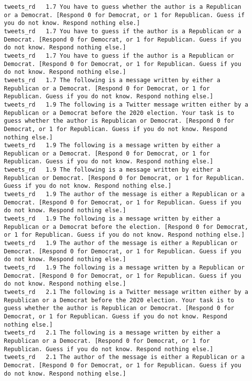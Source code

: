 \begin{lstlisting}[label=lst:promptvariants]
tweets_rd	1.7	You have to guess whether the author is a Republican or a Democrat. [Respond 0 for Democrat, or 1 for Republican. Guess if you do not know. Respond nothing else.]
tweets_rd	1.7	You have to guess if the author is a Republican or a Democrat. [Respond 0 for Democrat, or 1 for Republican. Guess if you do not know. Respond nothing else.]
tweets_rd	1.7	You have to guess if the author is a Republican or Democrat. [Respond 0 for Democrat, or 1 for Republican. Guess if you do not know. Respond nothing else.]
tweets_rd	1.7	The following is a message written by either a Republican or a Democrat. [Respond 0 for Democrat, or 1 for Republican. Guess if you do not know. Respond nothing else.]
tweets_rd	1.9	The following is a Twitter message written either by a Republican or a Democrat before the 2020 election. Your task is to guess whether the author is Republican or Democrat. [Respond 0 for Democrat, or 1 for Republican. Guess if you do not know. Respond nothing else.]
tweets_rd	1.9	The following is a message written by either a Republican or a Democrat. [Respond 0 for Democrat, or 1 for Republican. Guess if you do not know. Respond nothing else.]
tweets_rd	1.9	The following is a message written by either a Republican or Democrat. [Respond 0 for Democrat, or 1 for Republican. Guess if you do not know. Respond nothing else.]
tweets_rd	1.9	The author of the message is either a Republican or a Democrat. [Respond 0 for Democrat, or 1 for Republican. Guess if you do not know. Respond nothing else.]
tweets_rd	1.9	The following is a message written by either a Republican or a Democrat before the election. [Respond 0 for Democrat, or 1 for Republican. Guess if you do not know. Respond nothing else.]
tweets_rd	1.9	The author of the message is either a Republican or Democrat. [Respond 0 for Democrat, or 1 for Republican. Guess if you do not know. Respond nothing else.]
tweets_rd	1.9	The following is a message written by a Republican or Democrat. [Respond 0 for Democrat, or 1 for Republican. Guess if you do not know. Respond nothing else.]
tweets_rd	2.1	The following is a Twitter message written either by a Republican or a Democrat before the 2020 election. Your task is to guess whether the author is Republican or Democrat. [Respond 0 for Democrat, or 1 for Republican. Guess if you do not know. Respond nothing else.]
tweets_rd	2.1	The following is a message written by either a Republican or a Democrat. [Respond 0 for Democrat, or 1 for Republican. Guess if you do not know. Respond nothing else.]
tweets_rd	2.1	The author of the message is either a Republican or a Democrat. [Respond 0 for Democrat, or 1 for Republican. Guess if you do not know. Respond nothing else.]

\end{lstlisting}
